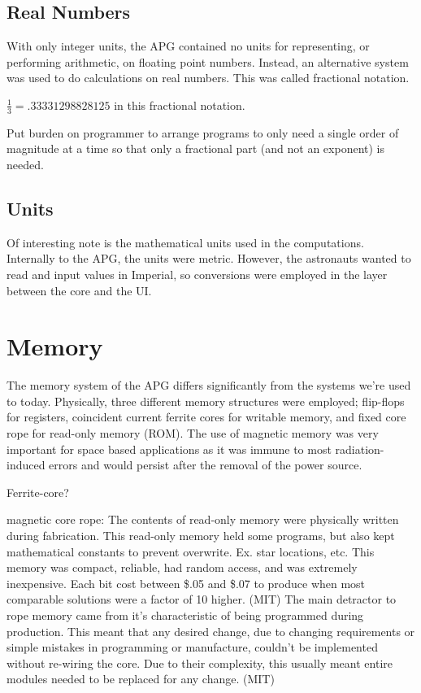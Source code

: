 \documentclass[a4paper,11pt]{article}
\begin{document}
\subsection{Real Numbers}
With only integer units, the APG contained no units for representing, or performing arithmetic, on floating point numbers.   Instead, an alternative system was used to do calculations on real numbers.  This was called fractional notation.  

$\frac{1}{3} = .33331298828125$ in this fractional notation.  

Put burden on programmer to arrange programs to only need a single order of magnitude at a time so that only a fractional part (and not an exponent) is needed.

\subsection{Units}
Of interesting note is the mathematical units used in the computations.  Internally to the APG, the units were metric.  However, the astronauts wanted to read and input values in Imperial, so conversions were employed in the layer between the core and the UI.


\section{Memory}
The memory system of the APG differs significantly from the systems we're used to today.  Physically, three different memory structures were employed; flip-flops for registers, coincident current ferrite cores for writable memory, and fixed core rope for read-only memory (ROM).  The use of magnetic memory was very important for space based applications as it was immune to most radiation-induced errors and would persist after the removal of the power source.

Ferrite-core?

magnetic core rope: The contents of read-only memory were physically written during fabrication.  This read-only memory held some programs, but also kept mathematical constants to prevent overwrite.  Ex. star locations, etc.  This memory was compact, reliable, had random access, and was extremely inexpensive.  Each bit cost between \$.05 and \$.07 to produce when most comparable solutions were a factor of 10 higher. (MIT) The main detractor to rope memory came from it's characteristic of being programmed during production.  This meant that any desired change, due to changing requirements or simple mistakes in programming or manufacture, couldn't be implemented without re-wiring the core.  Due to their complexity, this usually meant entire modules needed to be replaced for any change.  (MIT)
\end{document}
